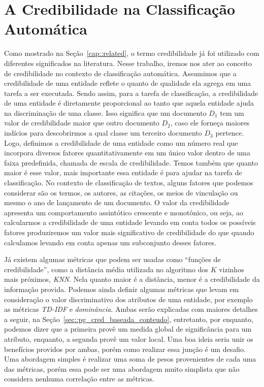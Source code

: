 \chapter{A Credibilidade na Classificação Automática} 
\label{cap::metodo}

Como mostrado na Seção~\ref{cap::related}, o termo credibilidade já foi utilizado com diferentes significados na literatura. Nesse trabalho, iremos nos ater ao conceito de credibilidade no contexto de classificação automática. Assumimos que a credibilidade de uma entidade reflete o quanto de qualidade ela agrega em uma tarefa a ser executada. Sendo assim, para a tarefa de classificação, a credibilidade de uma entidade é diretamente proporcional ao tanto que aquela entidade ajuda na discriminação de uma classe. Isso significa que um documento $D_{1}$ tem um valor de credibilidade maior que outro documento $D_{2}$, caso ele forneça maiores indícios para descobrirmos a qual classe um terceiro documento $D_{3}$ pertence. Logo, definimos a credibilidade de uma entidade como um número real que incorpora diversos fatores quantitativamente em um único valor dentro de uma faixa predefinida, chamada de escala de credibilidade. Temos também que quanto maior é esse valor, mais importante essa entidade é para ajudar na tarefa de classificação. No contexto de classificação de textos, alguns fatores que podemos considerar são os termos, os autores, as citações, os meios de vinculação ou mesmo o ano de lançamento de um documento. O valor da credibilidade apresenta um comportamento assintótico crescente e monotônico, ou seja, ao calcularmos a credibilidade de uma entidade levando em conta todos os possíveis fatores produziremos um valor mais significativo de credibilidade do que quando calculamos levando em conta apenas um subconjunto desses fatores.

Já existem algumas métricas que podem ser usadas como ``funções de credibilidade'', como a distância média utilizada no algoritmo dos $K$ vizinhos mais próximos, \textit{KNN}. Nela quanto maior é a distância, menor é a credibilidade da informação provida. Podemos ainda definir algumas métricas que levam em consideração o valor discriminativo dos atributos de uma entidade, por exemplo as métricas \textit{TD-IDF} e \textit{dominância}. Ambas serão explicadas com maiores detalhes a seguir, na Seção~\ref{sec::pg_cred_baseada_conteudo}, entretanto, por enquanto, podemos dizer que a primeira provê um medida global de significância para um atributo, enquanto, a segunda provê um valor local. Uma boa ideia seria unir os benefícios providos por ambas, porém como realizar essa junção é um desafio. Uma abordagem simples é realizar uma soma de pesos provenientes de cada uma das métricas, porém essa pode ser uma abordagem muito simplista que não considera nenhuma correlação entre as métricas.

